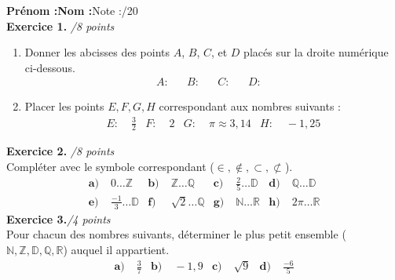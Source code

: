 \documentclass[11pt]{article}
\begin{document}
\vspace{2.2cm}

\noindent\textbf{Prénom :}\hfill\textbf{Nom :}\hfill Note
:\hspace{1.5cm}/20\vspace{.5cm}\\
\textbf{Exercice 1.} \hspace{2cm}\emph{/8 points}\\
\begin{enumerate}
  \item Donner les abcisses des points $A$, $B$, $C$, et $D$ placés sur la droite
numérique ci-dessous.
\begin{align*}
  A:& &
  B:& &
  C:& &
  D:&
\end{align*}
  \item Placer les points $E, F, G, H$ correspondant aux nombres suivants :
    \begin{align*}
      E:&\; \frac{3}{2} &
      F:&\; 2 &
      G:&\; \pi\approx 3,14 &
      H:&\; -1,25
    \end{align*}
\end{enumerate}
\begin{center}
\end{center}
\noindent \textbf{Exercice 2.} \hspace{2cm}\emph{/8 points}\\
Compléter avec le symbole correspondant ($\in, \notin, \subset, \not\subset$).
\begin{align*}
  \textbf{a)}\; & 0 \ldots \mathbb{Z} &
  \textbf{b)}\; & \mathbb{Z} \ldots \mathbb{Q} &
  \textbf{c)}\; & \frac{2}{5} \ldots \mathbb{D} &
  \textbf{d)}\; & \mathbb{Q} \ldots \mathbb{D} \\
  \textbf{e)}\; & \frac{-1}{3} \ldots \mathbb{D} &
  \textbf{f)}\; & \sqrt 2 \ldots \mathbb{Q} &
  \textbf{g)}\; & \mathbb{N} \ldots \mathbb{R} &
  \textbf{h)}\; & 2\pi \ldots \mathbb{R}
\end{align*}
\textbf{Exercice 3.}\hspace{2cm}\emph{/4 points}\\
{\small Pour chacun des nombres suivants, déterminer le plus petit ensemble
($\mathbb{N}, \mathbb{Z}, \mathbb{D}, \mathbb{Q}, \mathbb{R}$) auquel il
appartient.}
\begin{align*}
  \textbf{a)}&\;\frac{3}{7} &
  \textbf{b)}&\;-1,9 &
  \textbf{c)}&\;\sqrt{9} &
  \textbf{d)}&\;\frac{-6}{5}
\end{align*}
\end{document}
